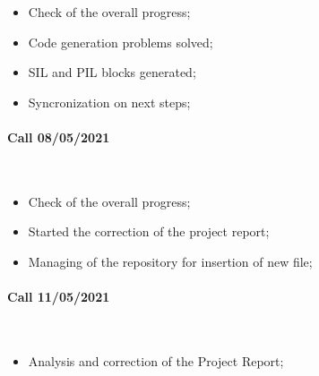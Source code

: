 \documentclass[12pt,a4paper]{report}
\begin{document}
\begin{itemize}
	\item Check of the overall progress;
	
	\item Code generation problems solved;
	
	\item SIL and PIL blocks generated;
	
	\item Syncronization on next steps;
	
\end{itemize}

\paragraph{Call 08/05/2021 \\}~

\begin{itemize}
	\item Check of the overall progress;
	
	\item Started the correction of the project report;
	
	\item Managing of the repository for insertion of new file;
	
\end{itemize}

\paragraph{Call 11/05/2021 \\}~

\begin{itemize}
	\item Analysis and correction of the Project Report;
	
\end{itemize}
\end{document}
